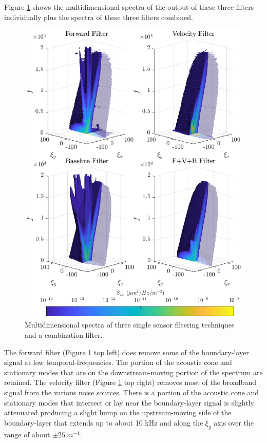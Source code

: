 Figure \ref{fig:08_dispersion_filters} shows the multidimensional spectra of the output of these three filters individually plus the spectra of these three filters combined.
\begin{figure}
  \centering
  \includegraphics{../matlab/08_conclusion/dispersion_filters.eps}
  \caption{Multidimensional spectra of three single sensor filtering techniques and a combination filter.}
  \label{fig:08_dispersion_filters}
\end{figure}
The forward filter (Figure \ref{fig:08_dispersion_filters} top left) does remove some of the boundary-layer signal at low temporal-frequencies.
The portion of the acoustic cone and stationary modes that are on the downstream-moving portion of the spectrum are retained.
The velocity filter (Figure \ref{fig:08_dispersion_filters} top right) removes most of the broadband signal from the various noise sources.
There is a portion of the acoustic cone and stationary modes that intersect or lay near the boundary-layer signal is slightly attenuated producing a slight hump on the upstream-moving side of the boundary-layer that extends up to about 10 kHz and along the $\xi_y$ axis over the range of about $\pm25\ m^{-1}$.

